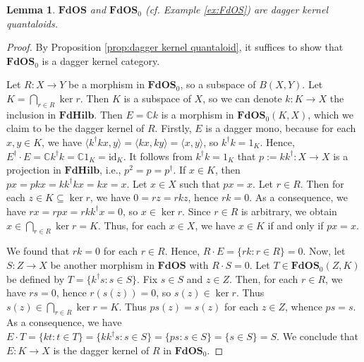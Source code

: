 \documentclass[12pt]{tac}
\newtheorem{lemma}[theorem]{Lemma}
\theoremstyle{definition}
\theoremstyle{remark}
\newcommand{\CC}{\mathbb C}
\newcommand{\<}{\langle}
\renewcommand{\>}{\rangle}
\renewcommand{\:}{\colon}
\newcommand{\id}{\mathrm{id}}
\begin{document}
\begin{lemma}\label{lem:FdOS-dagger-kernels}
$\mathbf{FdOS}$ and $\mathbf{FdOS}_0$ (cf. Example \ref{ex:FdOS}) are dagger kernel quantaloids. 
\end{lemma}
\begin{proof}
By Proposition \ref{prop:dagger kernel quantaloid}, it suffices to show that $\mathbf{FdOS}_0$ is a dagger kernel category. 

    Let $R:X\to Y$ be a morphism in $\mathbf{FdOS}_0$, so a subspace of $B(X,Y)$. Let $K=\bigcap_{r\in R}\ker r$. Then $K$ is a subspace of $X$, so we can denote $k:K\to X$ the inclusion in $\mathbf{FdHilb}$. Then $E=\CC k$ is a morphism in $\mathbf{FdOS}_0(K,X)$, which we claim to be the dagger kernel of $R$. Firstly, $E$ is a dagger mono, because for each $x,y\in K$, we have $\langle k^\dag kx,y\rangle=\langle kx,ky\rangle=\langle x,y\rangle$, so $k^\dag k=1_K$. Hence, $E^\dag\cdot E=\CC k^\dag k=\CC 1_K=\id_K$. It follows from $k^\dag k=1_K$ that $p:=kk^\dag:X\to X$ is a projection in $\mathbf{FdHilb}$, i.e., $p^2=p=p^\dag$. If $x\in K$, then $px=pkx=kk^\dag k x=kx=x$. Let $x\in X$ such that $px=x$. Let $r\in R$. Then for each $z\in K\subseteq\ker r$, we have $0=rz=rkz$, hence $rk=0$.
    As a consequence, we have $rx=rpx=rkk^\dag x=0$, so $x\in\ker r$. Since $r\in R$ is arbitrary, we obtain $x\in\bigcap_{r\in R}\ker r=K$. Thus, for each $x\in X$, we have $x\in K$ if and only if $px=x$. 
    
    We found that $rk=0$ for each $r\in R$. Hence,  $R\cdot E=\{rk:r\in R\}=0$. Now, let $S:Z\to X$ be another morphism in $\mathbf{FdOS}$ with $R\cdot S=0$. Let $T\in\mathbf{FdOS}_0(Z,K)$ be defined by $T=\{k^\dag s:s\in S\}$. Fix $s\in S$ and $z\in Z$. Then, for each $r\in R$, we have $rs=0$, hence $r(s(z))=0$, so $s(z)\in\ker r$. Thus $s(z)\in\bigcap_{r\in R}\ker r=K$. Thus $ps(z)=s(z)$ for each $z\in Z$, whence $ps=s$. As a consequence, we have $E\cdot T=\{k t:t\in T\}=\{kk^\dag s:s\in S\}=\{ps:s\in S\}=\{s\in S\}=S$. We conclude that $E:K\to X$ is the dagger kernel of $R$ in $\mathbf{FdOS}_0$. 
\end{proof}
\end{document}

